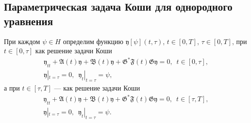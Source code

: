 \documentclass{report}
\begin{document}
	    \subsection{Параметрическая задача Коши для однородного уравнения}
При каждом $\psi\in H$ определим функцию $\mathfrak{y}[\psi](t,\tau)$, $t\in[0,T]$, $\tau\in[0,T]$, при $t\in[0,\tau]$ как решение задачи Коши
\begin{gather}\label{abstrChauchyprobeq:nonaut:parametric:homogenious.eq!t.less.than.tau}
{\mathfrak{y}}_{tt}+\mathfrak{A}(t){\mathfrak{y}}+\mathfrak{B}(t){\mathfrak{y}} + \mathfrak{G}^*\mathfrak{F}(t)\mathfrak{G}{\mathfrak{y}} = 0,\,\,\,t\in[0,\tau],\\
\label{abstrChauchyprobinitcond:nonaut:parametric:homogenious.eq!t.less.than.tau}
{\mathfrak{y}}|_{t=\tau}=0,\,\,\,{\mathfrak{y}}_t|_{t=\tau}=\psi,
\end{gather}
а при $t\in[\tau,T]$ --- как решение задачи Коши
\begin{gather}\label{abstrChauchyprobeq:nonaut:parametric:homogenious.eq!t.greater.than.tau}
{\mathfrak{y}}_{tt}+\mathfrak{A}(t){\mathfrak{y}}+\mathfrak{B}(t){\mathfrak{y}} + \mathfrak{G}^*\mathfrak{F}(t)\mathfrak{G}{\mathfrak{y}} = 0,\,\,\,t\in[\tau,T],\\
\label{abstrChauchyprobinitcond:nonaut:parametric:homogenious.eq!t.greater.than.tau}
{\mathfrak{y}}|_{t=\tau}=0,\,\,\,{\mathfrak{y}}_t|_{t=\tau}=\psi.
\end{gather}
	    
\end{document}

